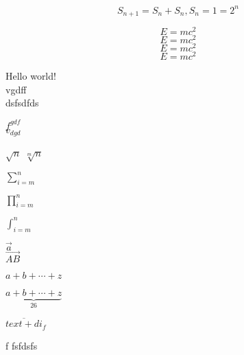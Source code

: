 \begin{displaymath} 
S_{n+1} = S_{n} + S_{n},  
S_{n}=1=2^{n} 
\end{displaymath}


\begin{equation} 
E=mc^2 
\end{equation}
\begin{equation} 
E=mc^2 
\end{equation}
\begin{equation} 
E=mc^2 
\end{equation}
\begin{equation} 
E=mc^2 
\end{equation}


Hello world! \\
vgdff \\
dsfsdfds

$f^{gdf}$ \\
$v_{dgd}$

$\sqrt{n}$
$\sqrt[m]{n}$

$\sum_{i=m}^{n}$

$\prod_{i=m}^{n}$


$\int_{i=m}^n$


$\vec {a}$\\
$\overrightarrow{AB}$

$a+b+\cdots+z$

$\underbrace{a+b+\cdots+z}_{26}$

$\overline{text+di}_{f}$

{f}
fsfdsfs

































